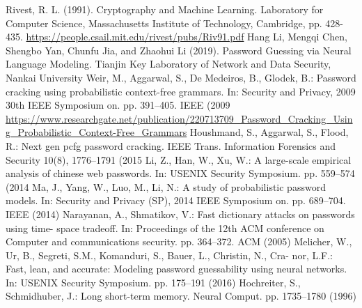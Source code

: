 \begin{thebibliography}    
        Rivest, R. L. (1991). Cryptography and Machine Learning. 
        Laboratory for Computer Science,
        Massachusetts Institute of Technology,
        Cambridge, pp. 428-435.
        \url{https://people.csail.mit.edu/rivest/pubs/Riv91.pdf}
        Hang Li, Mengqi Chen, Shengbo Yan, Chunfu Jia, and Zhaohui Li (2019). Password Guessing via Neural Language Modeling.
        Tianjin Key Laboratory of Network and Data Security, Nankai University
        \url{}
        Weir, M., Aggarwal, S., De Medeiros, B., Glodek, B.: Password cracking using
        probabilistic context-free grammars. In: Security and Privacy, 2009 30th IEEE
        Symposium on. pp. 391–405. IEEE (2009
        \url{https://www.researchgate.net/publication/220713709_Password_Cracking_Using_Probabilistic_Context-Free_Grammars}
        Houshmand, S., Aggarwal, S., Flood, R.: Next gen pcfg password cracking. IEEE
        Trans. Information Forensics and Security 10(8), 1776–1791 (2015
        \url{}
        Li, Z., Han, W., Xu, W.: A large-scale empirical analysis of chinese web passwords.
        In: USENIX Security Symposium. pp. 559–574 (2014
        \url{}
        Ma, J., Yang, W., Luo, M., Li, N.: A study of probabilistic password models. In:
        Security and Privacy (SP), 2014 IEEE Symposium on. pp. 689–704. IEEE (2014)
        \url{}
        Narayanan, A., Shmatikov, V.: Fast dictionary attacks on passwords using time-
        space tradeoﬀ. In: Proceedings of the 12th ACM conference on Computer and
        communications security. pp. 364–372. ACM (2005)
        \url{}
        Melicher, W., Ur, B., Segreti, S.M., Komanduri, S., Bauer, L., Christin, N., Cra-
        nor, L.F.: Fast, lean, and accurate: Modeling password guessability using neural
        networks. In: USENIX Security Symposium. pp. 175–191 (2016)
        \url{}
        Hochreiter, S., Schmidhuber, J.: Long short-term memory. Neural Comput. pp.
        1735–1780 (1996)
        \url{}

\end{thebibliography}
